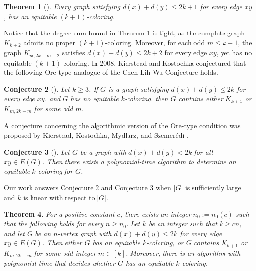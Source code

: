 \documentclass[11pt, a4paper]{article}
\newtheorem{theorem}{Theorem}[section]
\newtheorem{conj}[theorem]{Conjecture}
\theoremstyle{definition}
\newcommand{\<}{\subseteq}
\begin{document}
\begin{theorem}[\cite{KK2008}]\label{KK2008}
    Every graph satisfying $d(x)+d(y)\le 2k+1$ for every edge $xy$, has an equitable $(k+1)$-coloring.
\end{theorem}
Notice that the degree sum bound in Theorem \ref{KK2008} is tight, as the complete graph $K_{k+2}$ admits no proper $(k+1)$-coloring. %
 Moreover,  for each odd $m\le k+1$, the graph $K_{m,2k-m+2}$ satisfies $d(x)+d(y)\le 2k+2$ for every edge $xy$, yet has no equitable $(k+1)$-coloring.  %
 In 2008, Kierstead and Kostochka \cite{KK2008}  
 conjectured that the following Ore-type analogue of the Chen-Lih-Wu Conjecture holds. 
\begin{conj}%
[\cite{KK2008}]\label{cKK2008}
Let $k\ge 3$. If $G$ is a graph  satisfying $d(x)+d(y)\le 2k$ for every edge $xy$, and $G$ has no equitable $k$-coloring, then $G$ contains either $K_{k+1}$ or $K_{m,2k-m}$ for some odd $m$.
\end{conj}
A conjecture concerning the algorithmic version of the Ore-type condition was proposed by Kierstead, Kostochka, Mydlarz, and Szemer\'{e}di \cite{KKMS2008}. 
\begin{conj}[\cite{KKMS2008}]\label{cKKMS2008}
    Let $G$ be a graph with $d(x)+d(y)< 2k$ for all $xy\in E(G)$. Then there exists a polynomial-time algorithm to determine an  equitable $k$-coloring for $G$.
\end{conj}




Our work answers Conjecture \ref{cKK2008} and Conjecture \ref{cKKMS2008} when $|G|$ is sufficiently large and $k$ is linear with respect to $|G|$.

\begin{theorem}\label{mainore}
    For a positive constant $c$, there exists an integer $n_0:=n_0(c)$ such that the following holds for every $n\geq n_0$. Let $k$ be an integer such that $k\geq cn$, and let $G$ be an $n$-vertex graph with  $d(x)+d(y)\le 2k$ for every edge $xy\in E(G)$. %
    Then either $G$ has an equitable $k$-coloring, or $G$ contains $K_{k+1}$ or $K_{m,2k-m}$ for some odd integer $m\in [k]$. Moreover, there
is an algorithm with polynomial time 
that decides whether $G$ has an equitable $k$-coloring. 
\end{theorem}
\end{document}
